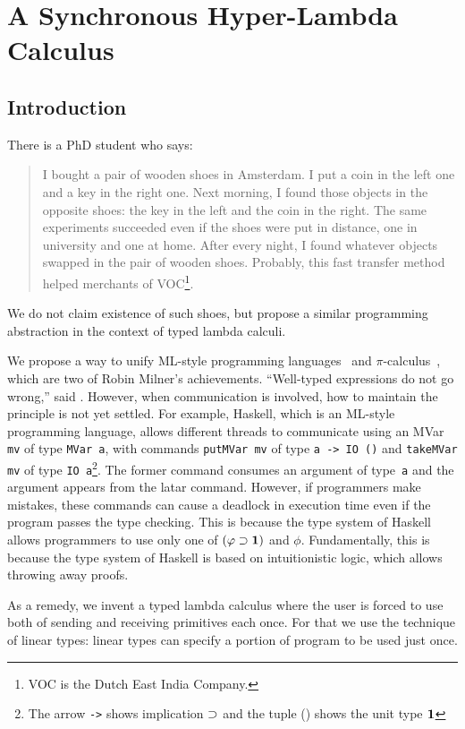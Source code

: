 \chapter{A Synchronous Hyper-Lambda Calculus}
\label{ch:exchange}

\section{Introduction}

There is a PhD student who says:
\begin{quotation}
 I bought a pair of wooden shoes in Amsterdam.  I put
 a coin in the left one and a key in the right one.
 Next morning, I found those objects in the opposite shoes:
 the key in the left and the coin in the right.
 The same experiments succeeded even if the shoes were put in distance, one in
 university and one at home.  After every night, I found whatever objects swapped in
 the pair of wooden shoes.
 Probably, this fast transfer method helped merchants of
 VOC\footnote{VOC is the Dutch East India Company.}.
\end{quotation}
We do not claim existence of such shoes, but propose
a similar programming abstraction in the context of typed lambda calculi.

We propose a way to unify ML-style programming
languages~\citep{milner1997definition, marlow2010haskell} and
$\pi$-calculus~\citep{milner1999communicating}, which are two of Robin
Milner's achievements.
``Well-typed expressions do not go wrong,'' said \citet{milner1978}.
However, when communication is involved, how to maintain the principle
is not yet settled.
For example, Haskell, which is an ML-style programming language,
allows different threads to communicate using an MVar \texttt{mv} of
type \texttt{MVar
a}, with commands
\texttt{putMVar mv} of type \texttt{a -> IO ()} and \texttt{takeMVar mv}
of type \texttt{IO
a}\footnote{The arrow \texttt{->} shows implication $\supset$ and the tuple
() shows the unit type $\mathbf{1}$}.
The former command consumes an argument of type~\texttt{a} and
the argument appears from the latar command.
However, if programmers make mistakes, these commands can
cause a deadlock in execution time even if the program passes the type
checking.
This is because the type system of Haskell allows programmers to
use only one of $(\varphi\supset \mathbf{1})$ and $\phi$.
Fundamentally, this is because the type system of Haskell
is based on intuitionistic logic, which allows throwing away proofs.

As a remedy, we invent a typed lambda calculus where
the user is forced to use both of sending and receiving primitives each once.
For that we use the technique of linear types:
linear types can specify a portion of program to be used
just once.

